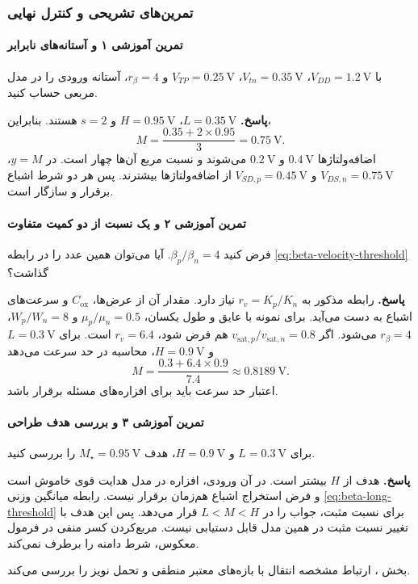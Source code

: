 \subsubsection{تمرین‌های تشریحی و کنترل نهایی}
\label{sec:beta-practice}
\paragraph*{تمرین آموزشی ۱ و آستانه‌های نابرابر}
با \(V_{DD}=\qty{1.2}{\volt}\)،
\(V_{tn}=\qty{0.35}{\volt}\)،
\(V_{TP}=\qty{0.25}{\volt}\) و \(r_\beta=4\)، آستانه
ورودی را در مدل مربعی حساب کنید.

\textbf{پاسخ.}
\(L=\qty{0.35}{\volt}\)، \(H=\qty{0.95}{\volt}\) و
\(s=2\) هستند. بنابراین،
\[
 M=\frac{0.35+2\times0.95}{3}=\qty{0.75}{\volt}.
\]
اضافه‌ولتاژها \(\qty{0.4}{\volt}\) و
\(\qty{0.2}{\volt}\) می‌شوند و نسبت مربع آن‌ها چهار است.
در \(y=M\)، \(V_{DS,n}=\qty{0.75}{\volt}\) و
\(V_{SD,p}=\qty{0.45}{\volt}\) از اضافه‌ولتاژها بیشترند.
پس هر دو شرط اشباع برقرار و  سازگار است.

\paragraph*{تمرین آموزشی ۲ و یک نسبت از دو کمیت متفاوت}
فرض کنید \(\beta_p/\beta_n=4\). آیا می‌توان همین عدد را در
رابطه \eqref{eq:beta-velocity-threshold} گذاشت؟

\textbf{پاسخ.}
رابطه مذکور به \(r_v=K_p/K_n\) نیاز دارد. مقدار آن از
عرض‌ها، \(C_{\mathrm{ox}}\) و سرعت‌های اشباع به دست می‌آید.
برای نمونه با عایق و طول یکسان،
\(\mu_p/\mu_n=0.5\) و \(W_p/W_n=8\)،
\(r_\beta=4\) می‌شود. اگر
\(v_{\mathrm{sat},p}/v_{\mathrm{sat},n}=0.8\) هم فرض شود،
\(r_v=6.4\) است. برای \(L=\qty{0.3}{\volt}\) و
\(H=\qty{0.9}{\volt}\)، محاسبه در حد سرعت می‌دهد
\[
 M=\frac{0.3+6.4\times0.9}{7.4}\approx\qty{0.8189}{\volt}.
\]
اعتبار حد سرعت باید برای افزاره‌های مسئله برقرار باشد.

\paragraph*{تمرین آموزشی ۳ و بررسی هدف طراحی}
برای \(L=\qty{0.3}{\volt}\) و \(H=\qty{0.9}{\volt}\)،
هدف \(M_\star=\qty{0.95}{\volt}\) را بررسی کنید.

\textbf{پاسخ.}
هدف از \(H\) بیشتر است. در آن ورودی، افزاره  در
مدل هدایت قوی خاموش است و فرض استخراج اشباع هم‌زمان برقرار
نیست. رابطه میانگین وزنی \eqref{eq:beta-long-threshold} برای
نسبت مثبت، جواب را در \(L<M<H\) قرار می‌دهد.
پس این هدف با تغییر نسبت مثبت در همین مدل قابل دستیابی نیست.
مربع‌کردن کسر منفی در فرمول معکوس، شرط دامنه را برطرف نمی‌کند.

بخش ، ارتباط مشخصه انتقال با بازه‌های معتبر
منطقی و تحمل نویز را بررسی می‌کند.
